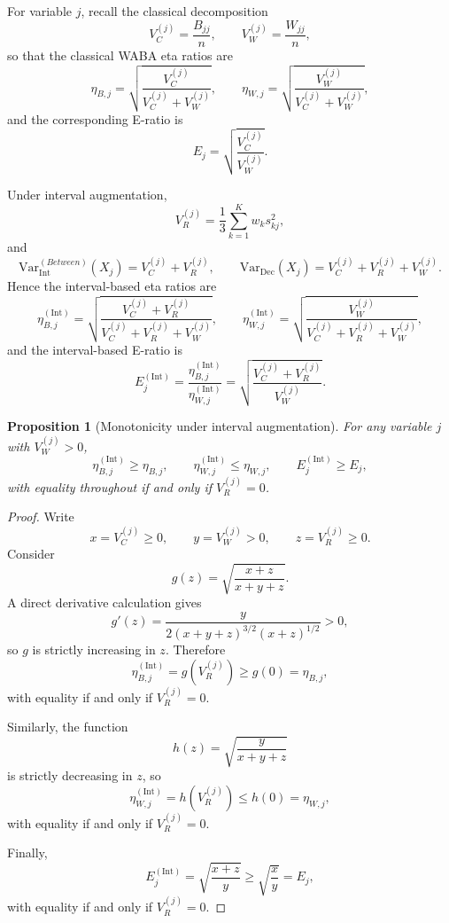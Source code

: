 \documentclass[preprint, times, 12pt, authoryear]{elsarticle}
\newtheorem{proposition}[theorem]{Proposition}
\begin{document}
 For variable $j$, recall the classical decomposition
 \[
 V_C^{(j)}=\frac{B_{jj}}{n},
 \qquad
 V_W^{(j)}=\frac{W_{jj}}{n},
 \]
 so that the classical WABA eta ratios are
 \begin{equation}\label{eq:eta_waba}
 	\eta_{B,j}
 	=
 	\sqrt{\frac{V_C^{(j)}}{V_C^{(j)}+V_W^{(j)}}},
 	\qquad
 	\eta_{W,j}
 	=
 	\sqrt{\frac{V_W^{(j)}}{V_C^{(j)}+V_W^{(j)}}},
 \end{equation}
 and the corresponding E-ratio is
 \[
 E_j=\sqrt{\frac{V_C^{(j)}}{V_W^{(j)}}}.
 \]
 
 Under interval augmentation,
 \[
 V_R^{(j)}=\frac{1}{3}\sum_{k=1}^K w_k s_{kj}^2,
 \]
 and
 \[
 \mathrm{Var}_{\mathrm{Int}}^{(Between)}(X_j)=V_C^{(j)}+V_R^{(j)},
 \qquad
 \mathrm{Var}_{\mathrm{Dec}}(X_j)=V_C^{(j)}+V_R^{(j)}+V_W^{(j)}.
 \]
 Hence the interval-based eta ratios are
 \begin{equation}\label{eq:eta_iwaba}
 	\eta_{B,j}^{(\mathrm{Int})}
 	=
 	\sqrt{\frac{V_C^{(j)}+V_R^{(j)}}{V_C^{(j)}+V_R^{(j)}+V_W^{(j)}}},
 	\qquad
 	\eta_{W,j}^{(\mathrm{Int})}
 	=
 	\sqrt{\frac{V_W^{(j)}}{V_C^{(j)}+V_R^{(j)}+V_W^{(j)}}},
 \end{equation}
 and the interval-based E-ratio is
 \begin{equation}\label{eq:E_ratio}
 	E_j^{(\mathrm{Int})}
 	=
 	\frac{\eta_{B,j}^{(\mathrm{Int})}}{\eta_{W,j}^{(\mathrm{Int})}}
 	=
 	\sqrt{\frac{V_C^{(j)}+V_R^{(j)}}{V_W^{(j)}}}.
 \end{equation}
 
 \begin{proposition}[Monotonicity under interval augmentation]\label{prop:eta_dominance}
 	For any variable $j$ with $V_W^{(j)}>0$,
 	\[
 	\eta_{B,j}^{(\mathrm{Int})}\ge \eta_{B,j},
 	\qquad
 	\eta_{W,j}^{(\mathrm{Int})}\le \eta_{W,j},
 	\qquad
 	E_j^{(\mathrm{Int})}\ge E_j,
 	\]
 	with equality throughout if and only if $V_R^{(j)}=0$.
 \end{proposition}
 
 \begin{proof}
 	Write
 	\[
 	x=V_C^{(j)}\ge 0,
 	\qquad
 	y=V_W^{(j)}>0,
 	\qquad
 	z=V_R^{(j)}\ge 0.
 	\]
 	Consider
 	\[
 	g(z)=\sqrt{\frac{x+z}{x+y+z}}.
 	\]
 	A direct derivative calculation gives
 	\[
 	g'(z)=\frac{y}{2(x+y+z)^{3/2}(x+z)^{1/2}}>0,
 	\]
 	so $g$ is strictly increasing in $z$. Therefore
 	\[
 	\eta_{B,j}^{(\mathrm{Int})}=g(V_R^{(j)})\ge g(0)=\eta_{B,j},
 	\]
 	with equality if and only if $V_R^{(j)}=0$.
 	
 	Similarly, the function
 	\[
 	h(z)=\sqrt{\frac{y}{x+y+z}}
 	\]
 	is strictly decreasing in $z$, so
 	\[
 	\eta_{W,j}^{(\mathrm{Int})}=h(V_R^{(j)})\le h(0)=\eta_{W,j},
 	\]
 	with equality if and only if $V_R^{(j)}=0$.
 	
 	Finally,
 	\[
 	E_j^{(\mathrm{Int})}=\sqrt{\frac{x+z}{y}}\ge \sqrt{\frac{x}{y}}=E_j,
 	\]
 	with equality if and only if $V_R^{(j)}=0$.
 \end{proof}
 
\end{document}
